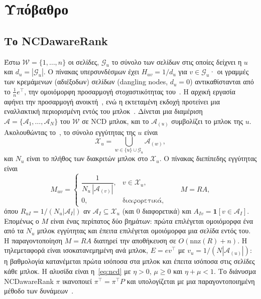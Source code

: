 \documentclass[11pt,a4paper]{article}
\theoremstyle{definition}
\theoremstyle{remark}
\begin{document}
\section{Υπόβαθρο}
\label{sec:background}

\subsection{Το NCDawareRank}
Έστω $\mathcal W=\{1,\dots,n\}$ οι σελίδες, $\mathcal G_u$ το σύνολο των σελίδων στις οποίες δείχνει η
$u$ και $d_u=|\mathcal G_u|$. Ο πίνακας υπερσυνδέσμων έχει $H_{uv}=1/d_u$ για $v\in\mathcal G_u$· οι
γραμμές των κρεμάμενων (αδιέξοδων) σελίδων (dangling nodes, $d_u=0$) αντικαθίστανται από το $\frac1n e^\top$, την ομοιόμορφη
προσαρμογή στοχαστικότητας του~\cite{page99}. Η αρχική εργασία αφήνει την προσαρμογή
ανοικτή~\cite{ng13}, ενώ η εκτεταμένη εκδοχή προτείνει μια εναλλακτική περιορισμένη εντός του
μπλοκ~\cite{ng20}. Δίνεται μια διαμέριση $\mathcal A=\{\mathcal A_1,\dots,\mathcal A_N\}$ του
$\mathcal W$ σε NCD μπλοκ, και το $\mathcal A_{(u)}$ συμβολίζει το μπλοκ της $u$. Ακολουθώντας
το~\cite[§3.1]{ng13}, το σύνολο εγγύτητας της $u$ είναι
\[
\mathcal X_u=\textstyle\bigcup_{w\in\{u\}\cup\mathcal G_u}\mathcal A_{(w)},
\]
και $N_u$ είναι το πλήθος των διακριτών μπλοκ στο $\mathcal X_u$. Ο πίνακας διεπίπεδης εγγύτητας είναι
\begin{equation}
M_{uv}=\begin{cases}\dfrac{1}{N_u\,|\mathcal A_{(v)}|},& v\in\mathcal X_u,\\[4pt] 0,&\text{διαφορετικά,}\end{cases}
\qquad M=RA,
\label{eq:M}
\end{equation}
όπου $R_{uI}=1/(N_u|\mathcal A_I|)$ αν $\mathcal A_I\subseteq\mathcal X_u$ (και $0$ διαφορετικά) και
$A_{Iv}=\mathbf 1[v\in\mathcal A_I]$. Επομένως ο $M$ είναι ένας περίπατος δύο βημάτων: πρώτα
επιλέγεται ομοιόμορφα ένα από τα $N_u$ μπλοκ εγγύτητας και έπειτα επιλέγεται ομοιόμορφα μια σελίδα
εντός του. Η παραγοντοποίηση $M=RA$ διατηρεί την αποθήκευση σε $O(\mathrm{nnz}(R)+n)$. Η τηλεμεταφορά
είναι ισοκατανεμημένη ανά μπλοκ, $E=ev^\top$ με $v_u=1/(N|\mathcal A_{(u)}|)$: η βαθμολογία
κατανέμεται πρώτα ισόποσα στα μπλοκ και έπειτα ισόποσα στις σελίδες κάθε μπλοκ. Η αλυσίδα είναι
η~\eqref{eq:ncd} με $\eta>0$, $\mu\ge0$ και $\eta+\mu<1$. Το διάνυσμα NCDawareRank $\pi$ ικανοποιεί
$\pi^\top=\pi^\top P$ και υπολογίζεται με μια παραγοντοποιημένη μέθοδο των δυνάμεων~\cite[Αλγ.~1]{ng13}.
\end{document}
